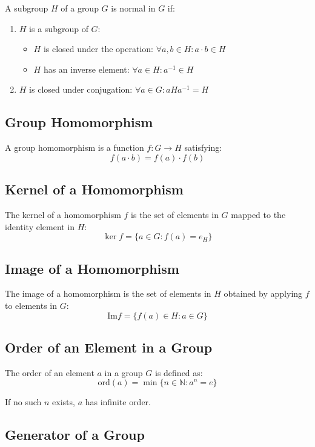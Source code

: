 \documentclass{article}
\begin{document}
A subgroup \( H \) of a group \( G \) is normal in \( G \) if:
\begin{enumerate}
    \item \( H \) is a subgroup of \( G \):
    \begin{itemize}
        \item \( H \) is closed under the operation: \( \forall a, b \in H: a \cdot b \in H \)
        \item \( H \) has an inverse element: \( \forall a \in H: a^{-1} \in H \)
    \end{itemize}
    \item \( H \) is closed under conjugation: \( \forall a \in G: aHa^{-1} = H \)
\end{enumerate}

\subsection{Group Homomorphism}

A group homomorphism is a function \( f: G \to H \) satisfying:
\[ f(a \cdot b) = f(a) \cdot f(b) \]

\subsection{Kernel of a Homomorphism}

The kernel of a homomorphism \( f \) is the set of elements in \( G \) mapped to the identity element in \( H \):
\[ \ker f = \{ a \in G : f(a) = e_H \} \]

\subsection{Image of a Homomorphism}

The image of a homomorphism is the set of elements in \( H \) obtained by applying \( f \) to elements in \( G \):
\[ \text{Im} f = \{ f(a) \in H : a \in G \} \]

\subsection{Order of an Element in a Group}

The order of an element \( a \) in a group \( G \) is defined as:
\[ \text{ord}(a) = \min\{ n \in \mathbb{N} : a^n = e \} \]

If no such \( n \) exists, \( a \) has infinite order.

\subsection{Generator of a Group}
\end{document}
